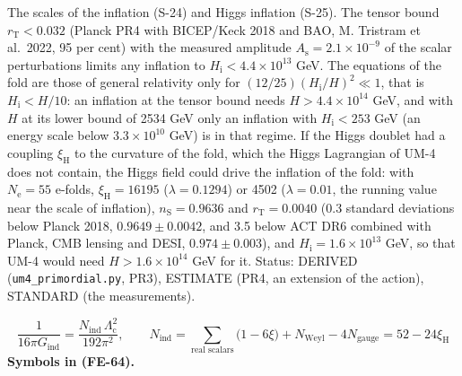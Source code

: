 \documentclass[
  10pt,
]{article}
\begin{document}
The scales of the inflation (S-24) and Higgs inflation (S-25). The
tensor bound \(r_{\mathrm{T}} < 0.032\) (Planck PR4 with BICEP/Keck 2018
and BAO, M. Tristram et al.~2022, 95 per cent) with the measured
amplitude \(A_{\mathrm{s}} = 2.1\times10^{-9}\) of the scalar
perturbations limits any inflation to
\(H_{\mathrm{i}} < 4.4\times10^{13}\) GeV. The equations of the fold are
those of general relativity only for
\((12/25)(H_{\mathrm{i}}/H)^2 \ll 1\), that is
\(H_{\mathrm{i}} < H/10\): an inflation at the tensor bound needs
\(H > 4.4\times10^{14}\) GeV, and with \(H\) at its lower bound of 2534
GeV only an inflation with \(H_{\mathrm{i}} < 253\) GeV (an energy scale
below \(3.3\times10^{10}\) GeV) is in that regime. If the Higgs doublet
had a coupling \(\xi_{\mathrm{H}}\) to the curvature of the fold, which
the Higgs Lagrangian of UM-4 does not contain, the Higgs field could
drive the inflation of the fold: with \(N_{\mathrm{e}} = 55\) e-folds,
\(\xi_{\mathrm{H}} = 16195\) (\(\lambda = 0.1294\)) or 4502
(\(\lambda = 0.01\), the running value near the scale of inflation),
\(n_{\mathrm{S}} = 0.9636\) and \(r_{\mathrm{T}} = 0.0040\) (0.3
standard deviations below Planck 2018, \(0.9649 \pm 0.0042\), and 3.5
below ACT DR6 combined with Planck, CMB lensing and DESI,
\(0.974 \pm 0.003\)), and \(H_{\mathrm{i}} = 1.6\times10^{13}\) GeV, so
that UM-4 would need \(H > 1.6\times10^{14}\) GeV for it. Status:
DERIVED (\texttt{um4\_primordial.py}, PR3), ESTIMATE (PR4, an extension
of the action), STANDARD (the measurements).

\[
\frac{1}{16\pi G_{\mathrm{ind}}} = \frac{N_{\mathrm{ind}}\,\Lambda_{\mathrm{c}}^2}{192\pi^2},\qquad
N_{\mathrm{ind}} = \sum_{\text{real scalars}}\big(1 - 6\xi\big) + N_{\mathrm{Weyl}} - 4N_{\mathrm{gauge}} = 52 - 24\xi_{\mathrm{H}} \tag{FE-64}
\] \textbf{Symbols in (FE-64).}
\end{document}
